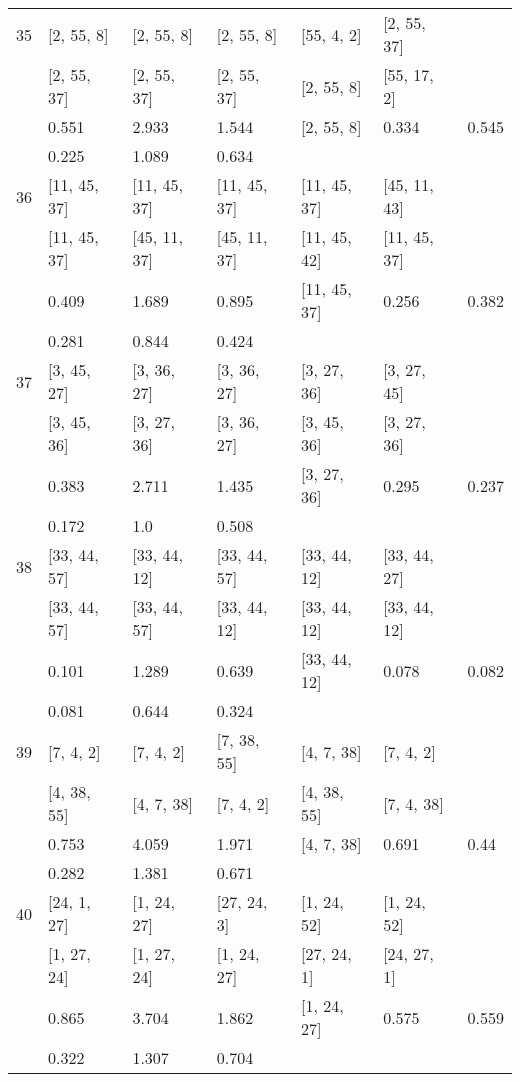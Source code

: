 \begin{longtable}{| l || l | l | l | l | l | l | }
\hline
35  & [2, 55, 8] & [2, 55, 8] & [2, 55, 8] & [55, 4, 2] & [2, 55, 37] \\
 & [2, 55, 37] & [2, 55, 37] & [2, 55, 37] & [2, 55, 8] & [55, 17, 2]\\
\hline
& 0.551 & 2.933 & 1.544 & [2, 55, 8] & 0.334 & 0.545\\
\hline
& 0.225 & 1.089 & 0.634 \\
\hline

\hline
36  & [11, 45, 37] & [11, 45, 37] & [11, 45, 37] & [11, 45, 37] & [45, 11, 43] \\
 & [11, 45, 37] & [45, 11, 37] & [45, 11, 37] & [11, 45, 42] & [11, 45, 37]\\
\hline
& 0.409 & 1.689 & 0.895 & [11, 45, 37] & 0.256 & 0.382\\
\hline
& 0.281 & 0.844 & 0.424 \\
\hline

\hline
37  & [3, 45, 27] & [3, 36, 27] & [3, 36, 27] & [3, 27, 36] & [3, 27, 45] \\
 & [3, 45, 36] & [3, 27, 36] & [3, 36, 27] & [3, 45, 36] & [3, 27, 36]\\
\hline
& 0.383 & 2.711 & 1.435 & [3, 27, 36] & 0.295 & 0.237\\
\hline
& 0.172 & 1.0 & 0.508 \\
\hline

\hline
38  & [33, 44, 57] & [33, 44, 12] & [33, 44, 57] & [33, 44, 12] & [33, 44, 27] \\
 & [33, 44, 57] & [33, 44, 57] & [33, 44, 12] & [33, 44, 12] & [33, 44, 12]\\
\hline
& 0.101 & 1.289 & 0.639 & [33, 44, 12] & 0.078 & 0.082\\
\hline
& 0.081 & 0.644 & 0.324 \\
\hline

\hline
39  & [7, 4, 2] & [7, 4, 2] & [7, 38, 55] & [4, 7, 38] & [7, 4, 2] \\
 & [4, 38, 55] & [4, 7, 38] & [7, 4, 2] & [4, 38, 55] & [7, 4, 38]\\
\hline
& 0.753 & 4.059 & 1.971 & [4, 7, 38] & 0.691 & 0.44\\
\hline
& 0.282 & 1.381 & 0.671 \\
\hline

\hline
40  & [24, 1, 27] & [1, 24, 27] & [27, 24, 3] & [1, 24, 52] & [1, 24, 52] \\
 & [1, 27, 24] & [1, 27, 24] & [1, 24, 27] & [27, 24, 1] & [24, 27, 1]\\
\hline
& 0.865 & 3.704 & 1.862 & [1, 24, 27] & 0.575 & 0.559\\
\hline
& 0.322 & 1.307 & 0.704 \\
\hline


\end{longtable}

